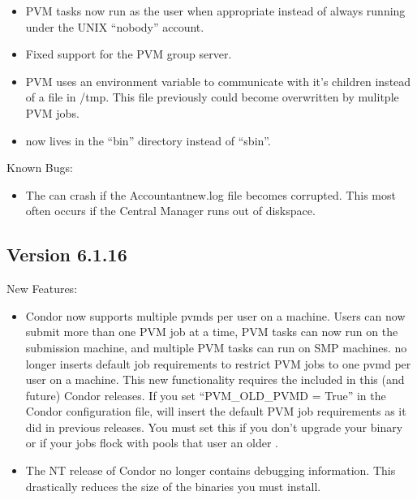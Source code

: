 \begin{itemize}
\item PVM tasks now run as the user when appropriate instead of always
running under the UNIX ``nobody'' account.

\item Fixed support for the PVM group server.

\item PVM uses an environment variable to communicate with it's children
instead of a file in /tmp. This file previously could become overwritten
by mulitple PVM jobs.

\item {} now lives in the ``bin'' directory instead of ``sbin''.

\end{itemize}

\noindent Known Bugs:

\begin{itemize}

\item The  can crash if the Accountantnew.log file becomes
corrupted. This most often occurs if the Central Manager runs out of diskspace. 

\end{itemize}

\subsection{\label{sec:New-6-1-16}Version 6.1.16}

\noindent New Features:

\begin{itemize}

\item Condor now supports multiple pvmds per user on a machine.  Users
can now submit more than one PVM job at a time, PVM tasks can now run
on the submission machine, and multiple PVM tasks can run on SMP
machines.   no longer inserts default job requirements
to restrict PVM jobs to one pvmd per user on a machine.  This new
functionality requires the  included in this (and future)
Condor releases.  If you set ``PVM\_OLD\_PVMD = True'' in the Condor
configuration file,  will insert the default PVM job
requirements as it did in previous releases.  You must set this if you
don't upgrade your  binary or if your jobs flock with pools
that user an older .

\item The NT release of Condor no longer contains debugging
information.
This drastically reduces the size of the binaries you must install.  

\end{itemize}

